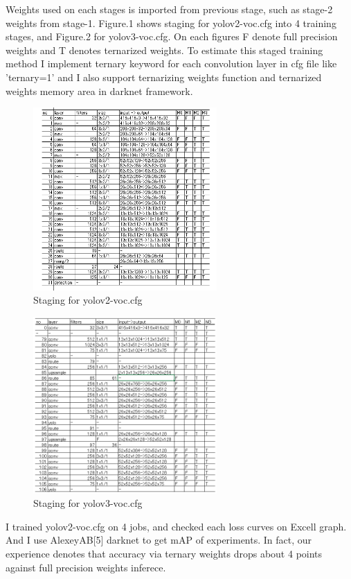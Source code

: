 \documentclass[twocolumn]{article}
\begin{document}
Weights used on each stages is imported from previous stage, such as stage-2 weights from stage-1.
Figure.1 shows staging for yolov2-voc.cfg into 4 training stages, and Figure.2 for yolov3-voc.cfg.
On each figures F denote full precision weights and T denotes ternarized weights.
To estimate this staged training method I implement ternary keyword for each convolution layer in cfg file like 'ternary=1' and I also support ternarizing weights function and ternarized weights memory area in darknet framework.

\begin{figure}
\includegraphics[width=7cm]{yolov2-voc_Stages.png}
\caption{Staging for yolov2-voc.cfg}
\end{figure}

\begin{figure}
\includegraphics[width=7cm]{yolov3-voc_Stages.png}
\caption{Staging for yolov3-voc.cfg}
\end{figure}

I trained yolov2-voc.cfg on 4 jobs, and checked each loss curves on Excell graph.
And I use AlexeyAB[5] darknet to get mAP of experiments.
In fact, our experience denotes that accuracy via ternary weights drops about 4 points against full precision weights inferece.
\end{document}
